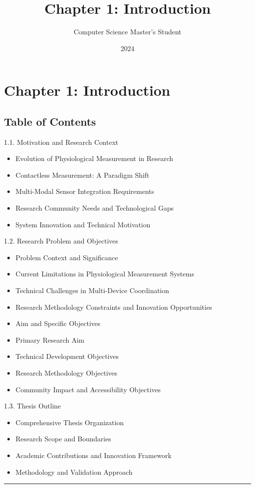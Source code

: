 \documentclass[12pt,a4paper]{article}
\title{Chapter 1: Introduction}
\author{Computer Science Master's Student}
\date{2024}
\begin{document}
\maketitle

\section{Chapter 1: Introduction}

\subsection{Table of Contents}

1.1. Motivation and Research Context

\begin{itemize}
\item Evolution of Physiological Measurement in Research
\item Contactless Measurement: A Paradigm Shift
\item Multi-Modal Sensor Integration Requirements
\item Research Community Needs and Technological Gaps
\item System Innovation and Technical Motivation

\end{itemize}
1.2. Research Problem and Objectives

\begin{itemize}
\item Problem Context and Significance
\item Current Limitations in Physiological Measurement Systems
\item Technical Challenges in Multi-Device Coordination
\item Research Methodology Constraints and Innovation Opportunities
\item Aim and Specific Objectives
\item Primary Research Aim
\item Technical Development Objectives
\item Research Methodology Objectives
\item Community Impact and Accessibility Objectives

\end{itemize}
1.3. Thesis Outline

\begin{itemize}
\item Comprehensive Thesis Organization
\item Research Scope and Boundaries
\item Academic Contributions and Innovation Framework
\item Methodology and Validation Approach

\end{itemize}
\hrule
\end{document}
